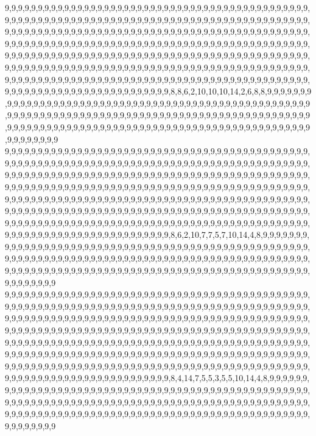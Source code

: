 9,9,9,9,9,9,9,9,9,9,9,9,9,9,9,9,9,9,9,9,9,9,9,9,9,9,9,9,9,9,9,9,9,9,9,9,9,9,9,9,9,9,9,9,9,9,9,9,9,9,9,9,9,9,9,9,9,9,9,9,9,9,9,9,9,9,9,9,9,9,9,9,9,9,9,9,9,9,9,9,9,9,9,9,9,9,9,9,9,9,9,9,9,9,9,9,9,9,9,9,9,9,9,9,9,9,9,9,9,9,9,9,9,9,9,9,9,9,9,9,9,9,9,9,9,9,9,9,9,9,9,9,9,9,9,9,9,9,9,9,9,9,9,9,9,9,9,9,9,9,9,9,9,9,9,9,9,9,9,9,9,9,9,9,9,9,9,9,9,9,9,9,9,9,9,9,9,9,9,9,9,9,9,9,9,9,9,9,9,9,9,9,9,9,9,9,9,9,9,9,9,9,9,9,9,9,9,9,9,9,9,9,9,9,9,9,9,9,9,9,9,9,9,9,9,9,9,9,9,9,9,9,9,9,9,9,9,9,9,9,9,9,9,9,9,9,9,9,9,9,9,9,9,9,9,9,9,9,9,9,9,9,9,9,9,9,9,9,9,9,9,9,9,9,9,9,9,9,9,9,9,9,9,9,9,9,9,9,9,9,9,9,9,9,9,9,9,9,9,9,9,9,9,9,9,9,9,9,9,9,9,9,9,9,9,9,9,9,9,9,9,9,9,9,9,9,9,9,9,9,9,9,9,9,9,9,9,9,9,9,9,9,9,9,9,9,9,8,8,6,2,10,10,10,14,2,6,8,8,9,9,9,9,9,9,9,9,9,9,9,9,9,9,9,9,9,9,9,9,9,9,9,9,9,9,9,9,9,9,9,9,9,9,9,9,9,9,9,9,9,9,9,9,9,9,9,9,9,9,9,9,9,9,9,9,9,9,9,9,9,9,9,9,9,9,9,9,9,9,9,9,9,9,9,9,9,9,9,9,9,9,9,9,9,9,9,9,9,9,9,9,9,9,9,9,9,9,9,9,9,9,9,9,9,9,9,9,9,9,9,9,9,9,9,9,9,9,9,9,9,9,9,9,9,9,9,9,9,9,9,9,9,9,9,9,9,9,9,9,9,9,9,9,9,9,9,9,9,9,9,9,9
9,9,9,9,9,9,9,9,9,9,9,9,9,9,9,9,9,9,9,9,9,9,9,9,9,9,9,9,9,9,9,9,9,9,9,9,9,9,9,9,9,9,9,9,9,9,9,9,9,9,9,9,9,9,9,9,9,9,9,9,9,9,9,9,9,9,9,9,9,9,9,9,9,9,9,9,9,9,9,9,9,9,9,9,9,9,9,9,9,9,9,9,9,9,9,9,9,9,9,9,9,9,9,9,9,9,9,9,9,9,9,9,9,9,9,9,9,9,9,9,9,9,9,9,9,9,9,9,9,9,9,9,9,9,9,9,9,9,9,9,9,9,9,9,9,9,9,9,9,9,9,9,9,9,9,9,9,9,9,9,9,9,9,9,9,9,9,9,9,9,9,9,9,9,9,9,9,9,9,9,9,9,9,9,9,9,9,9,9,9,9,9,9,9,9,9,9,9,9,9,9,9,9,9,9,9,9,9,9,9,9,9,9,9,9,9,9,9,9,9,9,9,9,9,9,9,9,9,9,9,9,9,9,9,9,9,9,9,9,9,9,9,9,9,9,9,9,9,9,9,9,9,9,9,9,9,9,9,9,9,9,9,9,9,9,9,9,9,9,9,9,9,9,9,9,9,9,9,9,9,9,9,9,9,9,9,9,9,9,9,9,9,9,9,9,9,9,9,9,9,9,9,9,9,9,9,9,9,9,9,9,9,9,9,9,9,9,9,9,9,9,9,9,9,9,9,9,9,9,9,9,9,9,9,9,9,9,9,9,9,9,9,9,9,9,9,9,8,6,2,10,7,7,5,7,10,14,4,8,9,9,9,9,9,9,9,9,9,9,9,9,9,9,9,9,9,9,9,9,9,9,9,9,9,9,9,9,9,9,9,9,9,9,9,9,9,9,9,9,9,9,9,9,9,9,9,9,9,9,9,9,9,9,9,9,9,9,9,9,9,9,9,9,9,9,9,9,9,9,9,9,9,9,9,9,9,9,9,9,9,9,9,9,9,9,9,9,9,9,9,9,9,9,9,9,9,9,9,9,9,9,9,9,9,9,9,9,9,9,9,9,9,9,9,9,9,9,9,9,9,9,9,9,9,9,9,9,9,9,9,9,9,9,9,9,9,9,9,9,9,9,9,9,9,9,9,9,9,9,9,9,9
9,9,9,9,9,9,9,9,9,9,9,9,9,9,9,9,9,9,9,9,9,9,9,9,9,9,9,9,9,9,9,9,9,9,9,9,9,9,9,9,9,9,9,9,9,9,9,9,9,9,9,9,9,9,9,9,9,9,9,9,9,9,9,9,9,9,9,9,9,9,9,9,9,9,9,9,9,9,9,9,9,9,9,9,9,9,9,9,9,9,9,9,9,9,9,9,9,9,9,9,9,9,9,9,9,9,9,9,9,9,9,9,9,9,9,9,9,9,9,9,9,9,9,9,9,9,9,9,9,9,9,9,9,9,9,9,9,9,9,9,9,9,9,9,9,9,9,9,9,9,9,9,9,9,9,9,9,9,9,9,9,9,9,9,9,9,9,9,9,9,9,9,9,9,9,9,9,9,9,9,9,9,9,9,9,9,9,9,9,9,9,9,9,9,9,9,9,9,9,9,9,9,9,9,9,9,9,9,9,9,9,9,9,9,9,9,9,9,9,9,9,9,9,9,9,9,9,9,9,9,9,9,9,9,9,9,9,9,9,9,9,9,9,9,9,9,9,9,9,9,9,9,9,9,9,9,9,9,9,9,9,9,9,9,9,9,9,9,9,9,9,9,9,9,9,9,9,9,9,9,9,9,9,9,9,9,9,9,9,9,9,9,9,9,9,9,9,9,9,9,9,9,9,9,9,9,9,9,9,9,9,9,9,9,9,9,9,9,9,9,9,9,9,9,9,9,9,9,9,9,9,9,9,9,9,9,9,9,9,9,9,9,9,9,9,9,9,8,4,14,7,5,5,3,5,5,10,14,4,8,9,9,9,9,9,9,9,9,9,9,9,9,9,9,9,9,9,9,9,9,9,9,9,9,9,9,9,9,9,9,9,9,9,9,9,9,9,9,9,9,9,9,9,9,9,9,9,9,9,9,9,9,9,9,9,9,9,9,9,9,9,9,9,9,9,9,9,9,9,9,9,9,9,9,9,9,9,9,9,9,9,9,9,9,9,9,9,9,9,9,9,9,9,9,9,9,9,9,9,9,9,9,9,9,9,9,9,9,9,9,9,9,9,9,9,9,9,9,9,9,9,9,9,9,9,9,9,9,9,9,9,9,9,9,9,9,9,9,9,9,9,9,9,9,9,9,9,9,9,9,9,9
